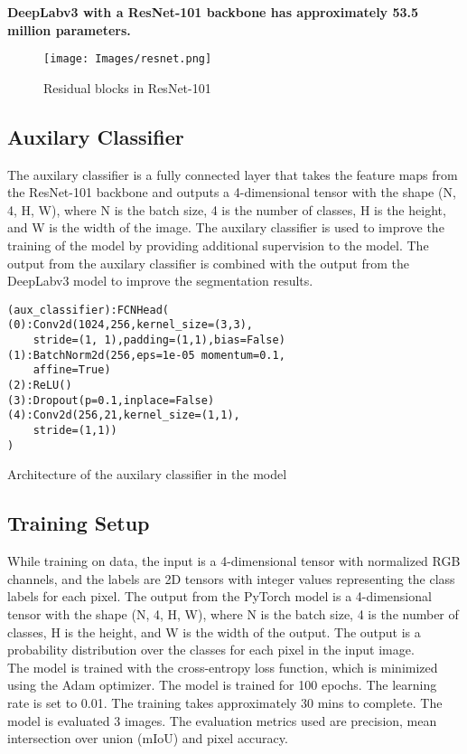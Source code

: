 \textbf{DeepLabv3 with a ResNet-101 backbone has approximately 53.5 million parameters.}

\begin{figure}[h]
    \centering
    \texttt{[image: Images/resnet.png]}
    \caption{Residual blocks in ResNet-101 \cite{resnet-image}}
    \label{fig:resnet}
\end{figure}


\subsection{Auxilary Classifier}

The auxilary classifier is a fully connected layer that takes the feature maps from the ResNet-101 backbone and outputs a 4-dimensional tensor with the shape (N, 4, H, W), where N is the batch size, 4 is the number of classes, H is the height, and W is the width of the image. The auxilary classifier is used to improve the training of the model by providing additional supervision to the model. The output from the auxilary classifier is combined with the output from the DeepLabv3 model to improve the segmentation results.

\begin{lstlisting}
(aux_classifier):FCNHead(
(0):Conv2d(1024,256,kernel_size=(3,3),
    stride=(1, 1),padding=(1,1),bias=False)
(1):BatchNorm2d(256,eps=1e-05 momentum=0.1,
    affine=True)
(2):ReLU()
(3):Dropout(p=0.1,inplace=False)
(4):Conv2d(256,21,kernel_size=(1,1),
    stride=(1,1))
)
\end{lstlisting}{Architecture of the auxilary classifier in the model}

\subsection{Training Setup}
While training on data, the input is a 4-dimensional tensor with normalized RGB channels, and the labels are 2D tensors with integer values representing the class labels for each pixel. The output from the PyTorch model is a 4-dimensional tensor with the shape (N, 4, H, W), where N is the batch size, 4 is the number of classes, H is the height, and W is the width of the output. The output is a probability distribution over the classes for each pixel in the input image.
\\ The model is trained with the cross-entropy loss function, which is minimized using the Adam optimizer. The model is trained for 100 epochs. The learning rate is set to 0.01. The training takes approximately 30 mins to complete. The model is evaluated 3 images. The evaluation metrics used are precision, mean intersection over union (mIoU) and pixel accuracy.

